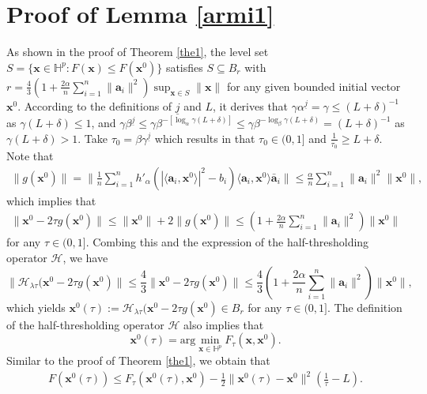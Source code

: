 \documentclass{article}
\numberwithin{equation}{section}
\begin{document}
	


 

\section{Proof of Lemma \ref{armi1}}
As shown in the proof of Theorem \ref{the1}, the level set $S=\{\mathbf{x}\in\mathbb{H}^p: F(\mathbf{x})\leq F(\mathbf{x}^0)\}$ satisfies $S\subseteq B_r$ with $r=\frac{4}{3}(1+\frac{2\alpha}{n}\sum_{i=1}^n\|\mathbf{a}_i\|^2)\sup_{\mathbf{x}\in S}\|\mathbf{x}\|$  for any given bounded initial vector $\mathbf{x}^0$. 
According to the definitions of $\underline{j}$ and $L$, it derives that
$\gamma\alpha^{\underline{j}}=\gamma\leq(L+\delta)^{-1}$
as $\gamma(L+\delta)\leq1$, and
$\gamma\beta^{\underline{j}}\leq\gamma\beta^{-[\log_\alpha\gamma(L+\delta)]}
\leq\gamma\beta^{-\log_\beta\gamma(L+\delta)}=(L+\delta)^{-1}$
as $\gamma(L+\delta)>1$. Take $\tau_0=\beta\gamma^{\underline{j}}$ which results in that $\tau_0\in(0,1]$ and $\frac{1}{\tau_0}\geq L+\delta$.
Note that
\begin{eqnarray}
\|g(\mathbf{x}^0)\|=\|\frac{1}{n}\sum\limits_{i=1}^n h'_{\alpha}(|\langle \mathbf{a}_i, \mathbf{x}^0\rangle|^2-b_i)\langle \mathbf{a}_i, \mathbf{x}^0\rangle \bar{\mathbf{a}}_i\|
\leq\frac{\alpha}{n}\sum\limits_{i=1}^n \|\mathbf{a}_i\|^2\|\mathbf{x}^0\|,\nonumber
\end{eqnarray}
which implies that \begin{eqnarray}
\|\mathbf{x}^0-2\tau g(\mathbf{x}^0)\|\leq\|\mathbf{x}^0\|+
2\|g(\mathbf{x}^0)\|\leq(1+\frac{2\alpha}{n}\sum\limits_{i=1}^n \|\mathbf{a}_i\|^2)\|\mathbf{x}^0\|\nonumber
\end{eqnarray}
for any $\tau\in(0,1]$. Combing this and the expression of the half-thresholding operator $\mathcal{H}$, we have
$$\|\mathcal{H}_{\lambda\tau}(\mathbf{x}^0-2\tau g(\mathbf{x}^0)\|\leq\frac{4}{3}\|\mathbf{x}^0-2\tau g(\mathbf{x}^0)\|
\leq\frac{4}{3}(1+\frac{2\alpha}{n}\sum\limits_{i=1}^n \|\mathbf{a}_i\|^2)\|\mathbf{x}^0\|,$$
which yields $\mathbf{x}^0(\tau):=\mathcal{H}_{\lambda\tau}(\mathbf{x}^0-2\tau g(\mathbf{x}^0)\in{}B_r$ for any $\tau\in(0,1]$.
The definition of the half-thresholding operator $\mathcal{H}$ also implies that
$$\mathbf{x}^0(\tau)=\mathrm{arg}\min_{\mathbf{x}\in\mathbb{H}^p}F_{\tau}(\mathbf{x},\mathbf{x}^0).$$
Similar to the proof of Theorem \ref{the1}, we obtain that
\begin{eqnarray}
F(\mathbf{x}^0(\tau))\leq F_{\tau}(\mathbf{x}^0(\tau),\mathbf{x}^0)-\frac{1}{2}\|\mathbf{x}^0(\tau)-\mathbf{x}^0\|^2
(\frac{1}{\tau}-L).\nonumber
\end{eqnarray}
\end{document}
